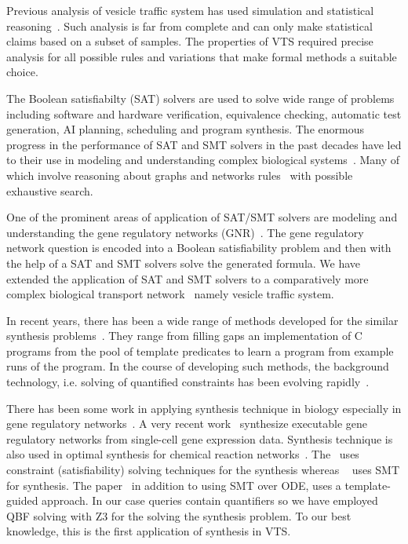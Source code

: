 Previous analysis of vesicle traffic system has used simulation and statistical reasoning~\cite{mani2016stacking}. 
%
Such analysis is far from complete and can only make statistical claims based on a subset of samples. 
%
The properties of VTS required precise analysis for all possible rules and variations that make formal methods a suitable choice.

The Boolean satisfiabilty (SAT) solvers are used to solve wide range of problems including
%
software and hardware verification, equivalence checking, automatic test generation,
AI planning, scheduling and program synthesis. 
%
The enormous progress in the performance of SAT and SMT solvers
in the past decades have led to their use in modeling and understanding complex biological systems~\cite{heule2010exact,yordanov2013smt,mangla2010timing}. 
%
Many of which involve reasoning about graphs and networks rules~\cite{guerra2012reasoning,chin2008biographe} with possible exhaustive search.
%

One of the prominent areas of application of SAT/SMT solvers are modeling and understanding the gene regulatory networks (GNR)~\cite{giacobbe2015model,rosenblueth2014inference, batt2010efficient, yordanov2016method, dunn2014defining, paoletti2014analyzing, koksal2013synthesis}.
%
The gene regulatory network question is encoded into a Boolean satisfiability problem and then with the help of a SAT and SMT solvers solve the generated formula. 
% 
We have extended the application of SAT and SMT solvers to a comparatively more complex biological transport network~\cite{mani2016stacking} namely vesicle traffic system. 

In recent years, there has been a wide range of methods
developed for the similar synthesis problems~\cite{sketch,sygus,exampleSynth}.
%
They range from filling gaps an implementation of C programs from the pool of template predicates to learn a program from example
runs of the program.
%
In the course of developing such methods,
the background technology, i.e. solving of quantified
constraints has been evolving rapidly~\cite{lonsing2010depqbf,z3Quant}.
%

There has been some work in
applying synthesis technique in biology especially in gene regulatory networks~\cite{shavit2016automated, fisher2015synthesising}. A very recent work~\cite{fisher2015synthesising} synthesize executable gene regulatory networks from single-cell gene expression data.
Synthesis technique is also used in optimal synthesis for chemical reaction networks~\cite{cardelli2017syntax}. The~\cite{fisher2015synthesising} uses constraint (satisfiability) solving techniques for the synthesis whereas ~\cite{shavit2016automated} uses SMT for synthesis. The paper~\cite{cardelli2017syntax} in addition to using SMT over ODE, uses a template-guided approach. In our case queries contain quantifiers so we have employed QBF solving with Z3 for the solving the synthesis problem. To our best knowledge, this is the first application of synthesis in VTS.

~        
